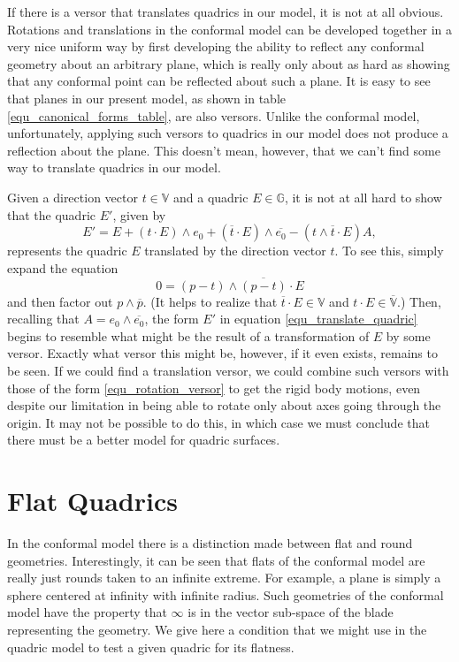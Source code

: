 \documentclass{birkjour}
\theoremstyle{definition}
\theoremstyle{remark}
\numberwithin{equation}{section}
\newcommand{\G}{\mathbb{G}}
\newcommand{\V}{\mathbb{V}}
\newcommand{\Alpha}{A}
\begin{document}
If there is a versor that translates quadrics in our model, it is not at all obvious.
Rotations and translations in the conformal model can be developed together in
a very nice uniform way by first developing the ability to reflect any conformal
geometry about an arbitrary plane, which is really only about as hard as showing
that any conformal point can be reflected about such a plane.
It is easy to see that planes in our present model, as shown
in table \eqref{equ_canonical_forms_table}, are also versors.  Unlike the conformal
model, unfortunately, applying such versors to quadrics in our model does not
produce a reflection about the plane.  This doesn't mean, however, that we can't
find some way to translate quadrics in our model.

Given a direction vector $t\in\V$ and a quadric $E\in\G$, it is not at all hard
to show that the quadric $E'$, given by
\begin{equation}\label{equ_translate_quadric}
E' = E + (t\cdot E)\wedge e_0 + (\overline{t}\cdot E)\wedge\overline{e_0}
- (t\wedge\overline{t}\cdot E)\Alpha,
\end{equation}
represents the quadric $E$ translated by the direction vector $t$.  To see this,
simply expand the equation
\begin{equation}
0 = (p-t)\wedge\overline{(p-t)}\cdot E
\end{equation}
and then factor out $p\wedge\overline{p}$.
(It helps to realize that $\overline{t}\cdot E\in\V$ and $t\cdot E\in\overline{\V}$.)
Then, recalling
that $\Alpha=e_0\wedge\overline{e_0}$, the form $E'$ in equation \eqref{equ_translate_quadric}
begins to resemble what might be the result of a transformation of $E$ by some versor.
Exactly what versor this might be, however, if it even exists, remains to be seen.
If we could find a translation versor, we could combine such versors with
those of the form \eqref{equ_rotation_versor} to get the rigid body motions,
even despite our limitation
in being able to rotate only about axes going through the origin.
It may not be possible to do this, in which case we must conclude that
there must be a better model for quadric surfaces.

\section{Flat Quadrics}

In the conformal model there is a distinction made between flat and round
geometries.  Interestingly, it can be seen that flats of the conformal model
are really just rounds taken to an infinite extreme.  For example, a plane
is simply a sphere centered at infinity with infinite radius.  Such geometries
of the conformal model have the property that $\infty$ is in the vector
sub-space of the blade representing the geometry.  We give here a
condition that we might use in the quadric model to test a given quadric
for its flatness.
\end{document}
